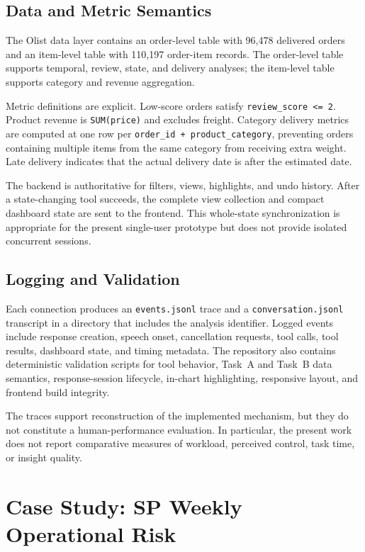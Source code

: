 \documentclass[journal]{IEEEtran}
\begin{document}
\subsection{Data and Metric Semantics}
\label{sec:data-semantics}

The Olist data layer contains an order-level table with 96,478 delivered orders and an item-level table with 110,197 order-item records. The order-level table supports temporal, review, state, and delivery analyses; the item-level table supports category and revenue aggregation.

Metric definitions are explicit. Low-score orders satisfy \texttt{review\_score <= 2}. Product revenue is \texttt{SUM(price)} and excludes freight. Category delivery metrics are computed at one row per \texttt{order\_id + product\_category}, preventing orders containing multiple items from the same category from receiving extra weight. Late delivery indicates that the actual delivery date is after the estimated date.

The backend is authoritative for filters, views, highlights, and undo history. After a state-changing tool succeeds, the complete view collection and compact dashboard state are sent to the frontend. This whole-state synchronization is appropriate for the present single-user prototype but does not provide isolated concurrent sessions.

\subsection{Logging and Validation}
\label{sec:logging}

Each connection produces an \texttt{events.jsonl} trace and a \texttt{conversation.jsonl} transcript in a directory that includes the analysis identifier. Logged events include response creation, speech onset, cancellation requests, tool calls, tool results, dashboard state, and timing metadata. The repository also contains deterministic validation scripts for tool behavior, Task~A and Task~B data semantics, response-session lifecycle, in-chart highlighting, responsive layout, and frontend build integrity.

The traces support reconstruction of the implemented mechanism, but they do not constitute a human-performance evaluation. In particular, the present work does not report comparative measures of workload, perceived control, task time, or insight quality.

\section{Case Study: SP Weekly Operational Risk}
\label{sec:case-study}
\end{document}

